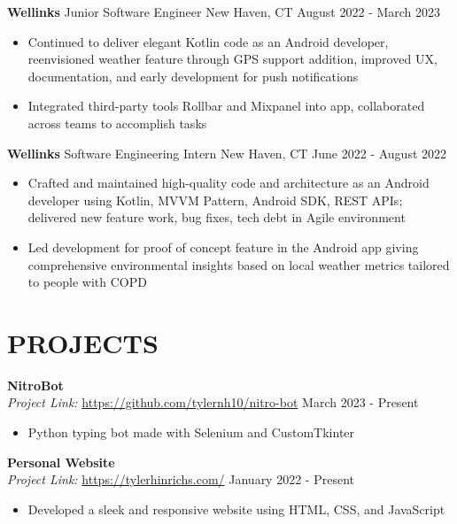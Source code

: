 \documentclass[a4paper,10pt]{extarticle}
\begin{document}
\noindent
\textbf{Wellinks} \textbar \space Junior Software Engineer \hfill New Haven, CT \textbar \space August 2022 - March 2023 %
\begin{itemize}
    \item Continued to deliver elegant Kotlin code as an Android developer, reenvisioned weather feature through GPS support addition, improved UX, documentation, and early development for push notifications
    \item Integrated third-party tools Rollbar and Mixpanel into app, collaborated across teams to accomplish tasks %
\end{itemize}

\noindent
\textbf{Wellinks} \textbar \space Software Engineering Intern \hfill New Haven, CT \textbar \space June 2022 - August 2022 %
\begin{itemize}
    \item Crafted and maintained high-quality code and architecture as an Android developer using Kotlin, MVVM Pattern, Android SDK, REST APIs; delivered new feature work, bug fixes, tech debt in Agile environment %
    \item Led development for proof of concept feature in the Android app giving comprehensive environmental insights based on local weather metrics tailored to people with COPD

\end{itemize}

\section*{PROJECTS}
\noindent
\textbf{NitroBot}\\ %
\textit{Project Link:} \url{https://github.com/tylernh10/nitro-bot} \hfill March 2023 - Present %
\begin{itemize}[topsep=3pt]
    \item Python typing bot made with Selenium and CustomTkinter %
\end{itemize}

\noindent
\textbf{Personal Website}\\ %
\textit{Project Link:} \url{https://tylerhinrichs.com/} \hfill January 2022 - Present %
\begin{itemize}[topsep=3pt]
    \item Developed a sleek and responsive website using HTML, CSS, and JavaScript %
\end{itemize}
\end{document}
